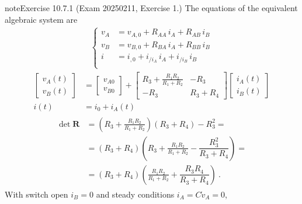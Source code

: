 \documentclass[letterpaper,10pt,italian]{jupyterBook}
\begin{document}
\begin{sphinxadmonition}{note}{Exercise 10.7.1 (Exam 2025\sphinxhyphen{}02\sphinxhyphen{}11, Exercise 1.)}
\sphinxAtStartPar
The equations of the equivalent algebraic system are
\begin{equation*}
\begin{split}\begin{cases}
 v_A & = v_{A,0} + R_{AA}   \, i_A + R_{AB}   \, i_B \\
 v_B & = v_{B,0} + R_{BA}   \, i_A + R_{BB}   \, i_B \\
 i   & = i_{ ,0} + i_{/i_A} \, i_A + i_{/i_B} \, i_B \\
\end{cases}\end{split}
\end{equation*}\begin{equation*}
\begin{split}
\begin{bmatrix} v_A(t) \\ v_B(t) \end{bmatrix} & =
\begin{bmatrix} v_{A0} \\ v_{B0} \end{bmatrix} + 
\begin{bmatrix}
  R_3 + \frac{R_1 R_2}{R_1 + R_2} & -R_3 \\ -R_3 & R_3 + R_4
\end{bmatrix}
\begin{bmatrix} i_A(t) \\ i_B(t) \end{bmatrix} \\
i(t) & = i_0 + i_A(t)
\end{split}
\end{equation*}\begin{equation*}
\begin{split}\begin{aligned}
  \det \mathbf{R}
  & = \left( R_3 + \frac{R_1 R_2}{R_1 + R_2}  \right) \left( R_3 + R_4 \right) - R_3^2 = \\
  & = ( R_3 + R_4 ) \left( R_3 + \frac{R_1 R_2}{R_1 + R_2} - \dfrac{R_3^2}{R_3 + R_4} \right) = \\
  & = ( R_3 + R_4 ) \left( \frac{R_1 R_2}{R_1 + R_2} + \dfrac{R_3 R_4}{R_3 + R_4} \right) \ .
\end{aligned}\end{split}
\end{equation*}
\sphinxAtStartPar
{} With switch open \(i_B = 0\) and steady conditions \(i_A = C \dot{v}_A = 0\),
\begin{equation*}

\end{equation*}
\end{sphinxadmonition}
\end{document}
